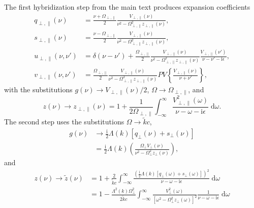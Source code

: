 The first hybridization step from the main text produces expansion coefficients
\begin{equation}
\begin{split}
q_{\perp,\parallel}(\nu) &= \frac{\nu + \Omega_{\perp,\parallel}}{2}\frac{V_{\perp,\parallel}(\nu)}{\nu^2 - \Omega_{\perp,\parallel}^2z_{\perp,\parallel}(\nu)},\\
s_{\perp,\parallel}(\nu) &= \frac{\nu - \Omega_{\perp,\parallel}}{2}\frac{V_{\perp,\parallel}(\nu)}{\nu^2 - \Omega_{\perp,\parallel}^2z_{\perp,\parallel}(\nu)},\\
u_{\perp,\parallel}(\nu,\nu') &= \delta(\nu - \nu') + \frac{\Omega_{\perp,\parallel}}{2}\frac{V_{\perp,\parallel}(\nu)}{\nu^2 - \Omega_{\perp,\parallel}^2z_{\perp,\parallel}(\nu)}\frac{V_{\perp,\parallel}(\nu')}{\nu - \nu' - \mathrm{i}\epsilon},\\
v_{\perp,\parallel}(\nu,\nu') &= \frac{\Omega_{\perp,\parallel}}{2}\frac{V_{\perp,\parallel}(\nu)}{\nu^2 - \Omega^2_{\perp,\parallel}z_{\perp,\parallel}(\nu)}PV\left\{\frac{V_{\perp,\parallel}(\nu)}{\nu + \nu'}\right\},
\end{split}
\end{equation}
with the substitutions $g(\nu)\to V_{\perp,\parallel}(\nu)/2$, $\Omega\to\Omega_{\perp,\parallel}$, and
\begin{equation}
z(\nu) \to z_{\perp,\parallel}(\nu) = 1 + \frac{1}{2\Omega_{\perp,\parallel}}\int_{-\infty}^\infty\frac{V_{\perp,\parallel}^2(\omega)}{\nu - \omega - \mathrm{i}\epsilon}\;\mathrm{d}\omega.
\end{equation}
The second step uses the substitutions $\Omega\to\tilde{k}c$,
\begin{equation}
\begin{split}
g(\nu)&\to\frac{\mathrm{i}}{2}\Lambda(k)\left[q_\perp(\nu) + s_\perp(\nu)\right]\\
&= \frac{\mathrm{i}}{2}\Lambda(k)\left(\frac{\Omega_\perp V_\perp(\nu)}{\nu^2 - \Omega_\perp^2z_\perp(\nu)}\right),
\end{split}
\end{equation}
and
\begin{equation}
\begin{split}
z(\nu)\to\tilde{z}(\nu) &= 1 + \frac{2}{\tilde{k}c}\int_{-\infty}^\infty\frac{\left(\frac{\mathrm{i}}{2}\Lambda(k)[q_\perp(\omega) + s_\perp(\omega)]\right)^2}{\nu - \omega - \mathrm{i}\epsilon}\;\mathrm{d}\omega\\
&= 1 - \frac{\Lambda^2(k)\Omega_\perp^2}{2\tilde{k}c}\int_{-\infty}^\infty\frac{V_\perp^2(\omega)}{[\omega^2 - \Omega_\perp^2z_\perp(\omega)]^2}\frac{1}{\nu - \omega - \mathrm{i}\epsilon}\;\mathrm{d}\omega
\end{split}
\end{equation}
